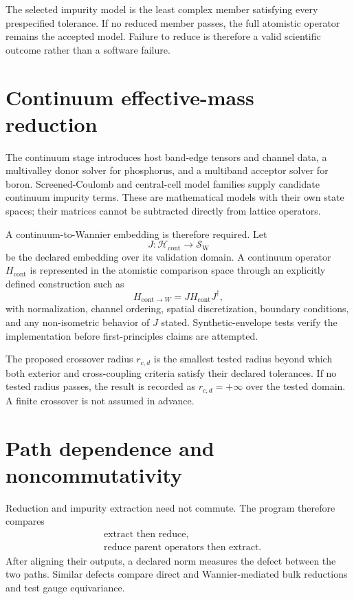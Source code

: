 The selected impurity model is the least complex member satisfying every
prespecified tolerance. If no reduced member passes, the full atomistic
operator remains the accepted model. Failure to reduce is therefore a valid
scientific outcome rather than a software failure.

\section{Continuum effective-mass reduction}

The continuum stage introduces host band-edge tensors and channel data, a
multivalley donor solver for phosphorus, and a multiband acceptor solver for
boron. Screened-Coulomb and central-cell model families supply candidate
continuum impurity terms. These are mathematical models with their own state
spaces; their matrices cannot be subtracted directly from lattice operators.

A continuum-to-Wannier embedding is therefore required. Let
\begin{equation}
  J:\mathcal H_{\mathrm{cont}}\longrightarrow\mathcal S_{\mathrm W}
\end{equation}
be the declared embedding over its validation domain. A continuum operator
$H_{\mathrm{cont}}$ is represented in the atomistic comparison space through
an explicitly defined construction such as
\begin{equation}
  H_{\mathrm{cont}\rightarrow W}=JH_{\mathrm{cont}}J^{\dagger},
\end{equation}
with normalization, channel ordering, spatial discretization, boundary
conditions, and any non-isometric behavior of $J$ stated. Synthetic-envelope
tests verify the implementation before first-principles claims are attempted.

The proposed crossover radius $r_{c,d}$ is the smallest tested radius beyond
which both exterior and cross-coupling criteria satisfy their declared
tolerances. If no tested radius passes, the result is recorded as
$r_{c,d}=+\infty$ over the tested domain. A finite crossover is not assumed in
advance.

\section{Path dependence and noncommutativity}

Reduction and impurity extraction need not commute. The program therefore
compares
\begin{align}
  &\text{extract then reduce},\\
  &\text{reduce parent operators then extract}.
\end{align}
After aligning their outputs, a declared norm measures the defect between the
two paths. Similar defects compare direct and Wannier-mediated bulk reductions
and test gauge equivariance.

